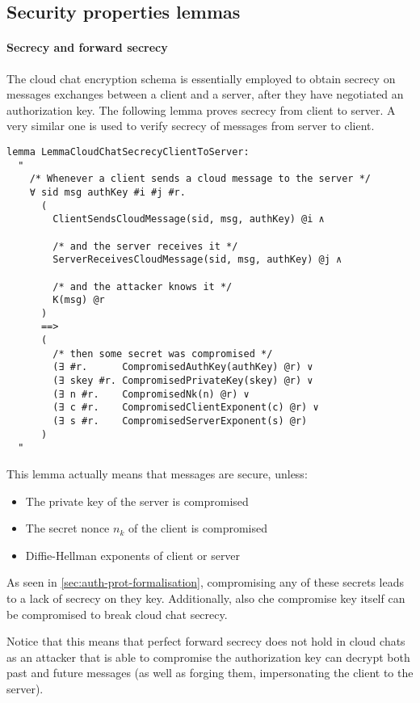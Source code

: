\subsection{Security properties lemmas}

\paragraph{Secrecy and forward secrecy} The cloud chat encryption schema is essentially employed to obtain secrecy on messages exchanges between a client and a server, after they have negotiated an authorization key.
The following lemma proves secrecy from client to server. A very similar one is used to verify secrecy of messages from server to client.

\begin{lstlisting}
lemma LemmaCloudChatSecrecyClientToServer:
  "
    /* Whenever a client sends a cloud message to the server */
    ∀ sid msg authKey #i #j #r.
      (
        ClientSendsCloudMessage(sid, msg, authKey) @i ∧

        /* and the server receives it */
        ServerReceivesCloudMessage(sid, msg, authKey) @j ∧

        /* and the attacker knows it */
        K(msg) @r
      )
      ==>
      (
        /* then some secret was compromised */
        (∃ #r.      CompromisedAuthKey(authKey) @r) ∨
        (∃ skey #r. CompromisedPrivateKey(skey) @r) ∨
        (∃ n #r.    CompromisedNk(n) @r) ∨
        (∃ c #r.    CompromisedClientExponent(c) @r) ∨
        (∃ s #r.    CompromisedServerExponent(s) @r)
      )
  "
\end{lstlisting}

This lemma actually means that messages are secure, unless:
\begin{itemize}
  \item The private key of the server is compromised
  \item The secret nonce $n_k$ of the client is compromised
  \item Diffie-Hellman exponents of client or server
\end{itemize}

As seen in \cref{sec:auth-prot-formalisation}, compromising any of these secrets leads to a lack of secrecy on they key. Additionally, also che compromise key itself can be compromised to break cloud chat secrecy.

Notice that this means that perfect forward secrecy does not hold in cloud chats as an attacker that is able to compromise the authorization key can decrypt both past and future messages (as well as forging them, impersonating the client to the server).
